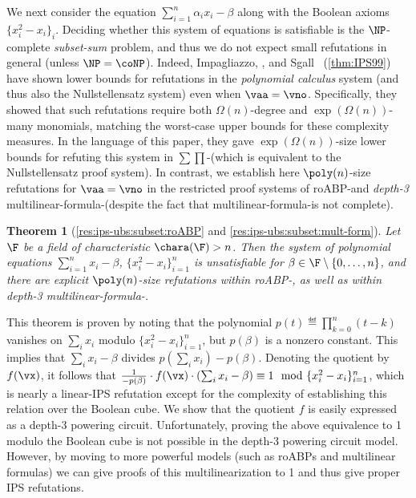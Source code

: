 \documentclass[11pt]{article}
\numberwithin{equation}{section}
\newtheorem{theorem}{Theorem}[section]
\theoremstyle{definition}
\theoremstyle{plain}
\begin{document}
We next consider the equation $\sum_{i=1}^n \alpha_i x_i-\beta$ along with the Boolean axioms $\{x_i^2-x_i\}_i$.  Deciding whether this system of equations is satisfiable is the $\NP$-complete \emph{subset-sum} problem, and
thus %
we do not expect small refutations in general (unless $\NP=\coNP$). Indeed, Impagliazzo, \Pudlak, and Sgall~\cite{IPS99} (\autoref{thm:IPS99}) have shown lower bounds for refutations in the \emph{polynomial calculus} system (and thus also the Nullstellensatz system) even when $\vaa=\vno$. Specifically, they showed that such refutations require both $\Omega(n)$-degree and $\exp(\Omega(n))$-many monomials, matching the worst-case upper bounds for these complexity measures.  In the language of this paper, they gave $\exp(\Omega(n))$-size lower bounds for refuting this system in $\sum\prod$-\lIPS (which is equivalent to the Nullstellensatz proof system).  In contrast, we establish here $\poly(n)$-size refutations for $\vaa=\vno$ in the restricted proof systems of roABP-\lIPS and \emph{depth-3} multilinear-formula-\lIPS (despite the fact that multilinear-formula-\lIPS is not complete).

\begin{theorem}[\autoref{res:ips-ubs:subset:roABP} and \autoref{res:ips-ubs:subset:mult-form}]
        Let $\F$ be a field of characteristic $\chara(\F)>n$. Then the system of polynomial equations $\sum_{i=1}^n x_i-\beta$, $\{x_i^2-x_i\}_{i=1}^n$ is unsatisfiable for $\beta\in\F\setminus\{0,\ldots,n\}$, and there are explicit $\poly(n)$-size refutations within roABP-\lIPS, as well as within depth-3 multilinear-formula-\lIPS.
\end{theorem}

This theorem is proven by noting that the polynomial $p(t)\eqdef\prod_{k=0}^n (t-k)$ vanishes on $\sum_i x_i$ modulo $\{x_i^2-x_i\}_{i=1}^n$, but $p(\beta)$ is a nonzero constant.  This implies that $\sum_i x_i-\beta$ divides $p(\sum_i x_i)-p(\beta)$.  Denoting the quotient by $f(\vx)$, it follows that $\frac{1}{-p(\beta)}\cdot f(\vx)\cdot (\sum_i x_i-\beta)\equiv 1\mod \{x_i^2-x_i\}_{i=1}^n$, which is nearly a linear-IPS refutation except for the complexity of establishing this relation over the Boolean cube.  We show that the quotient $f$ is easily expressed as a depth-3 powering circuit.  Unfortunately, proving the above equivalence to 1 modulo the Boolean cube is not possible in the depth-3 powering circuit model.  However, by moving to more powerful models (such as roABPs and multilinear formulas) we can give proofs of this multilinearization to 1 and thus give proper IPS refutations.
\end{document}
